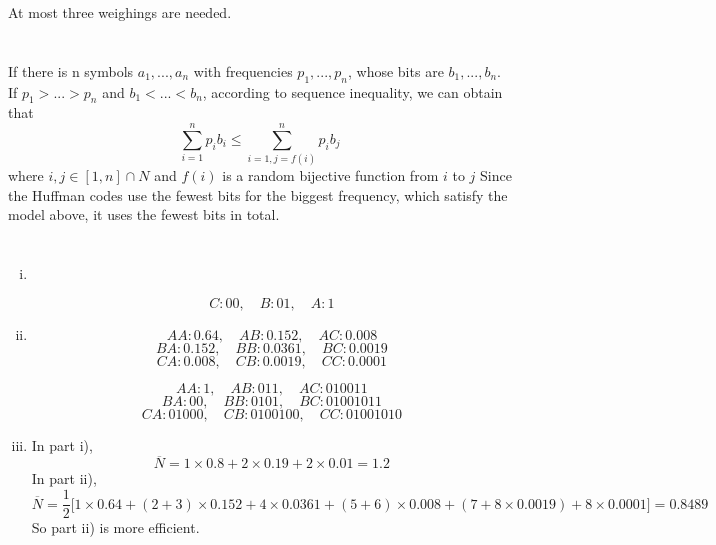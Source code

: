 \documentclass{article}
\begin{document}
At most three weighings are needed.

\newpage


\section{}
If there is n symbols $a_1,...,a_n$ with frequencies $p_1,...,p_n$, whose bits are $b_1,...,b_n$. If $p_1>...>p_n$ and $b_1<...<b_n$, according to sequence inequality, we can obtain that 
$$\sum_{i=1}^np_ib_i\leqslant\sum_{i=1,j=f(i)}^np_ib_j$$
where $i,j\in[1,n]\cap N$ and $f(i)$ is a random bijective function from $i$ to $j$
Since the Huffman codes use the fewest bits for the biggest frequency, which satisfy the model above, it uses the fewest bits in total.

\section{}
\begin{enumerate}[i)]
\item \ 
\begin{center}
\end{center}
$$C:00,\quad B:01,\quad A:1$$
\item
$$AA:0.64,\quad AB:0.152,\quad AC:0.008$$
$$BA:0.152,\quad BB:0.0361,\quad BC:0.0019$$
$$CA:0.008,\quad CB:0.0019,\quad CC:0.0001$$
\begin{center}
\end{center}
$$AA:1,\quad AB:011,\quad AC:010011$$
$$BA:00,\quad BB:0101,\quad BC:01001011$$
$$CA:01000,\quad CB:0100100,\quad CC:01001010$$
\item
In part i),
$$\overline{N}=1\times0.8+2\times0.19+2\times0.01=1.2$$
In part ii),
$$\overline{N}=\frac{1}{2}\Big[1\times0.64+(2+3)\times0.152+4\times0.0361
+(5+6)\times0.008+(7+8\times0.0019)+8\times0.0001\Big]=0.8489$$
So part ii) is more efficient.
\end{enumerate}
\end{document}
